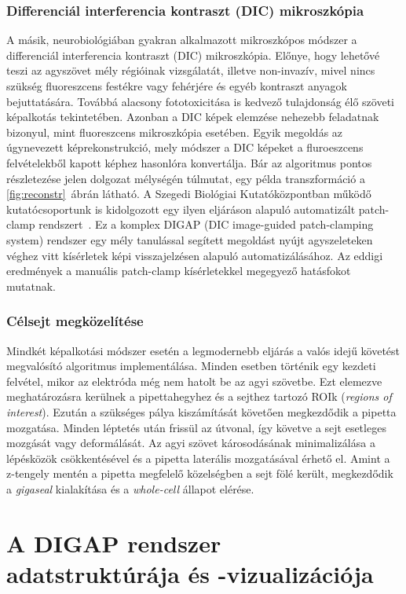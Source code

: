 \documentclass[12pt,a4paper]{report}
\begin{document}
\subsubsection*{Differenciál interferencia kontraszt (DIC) mikroszkópia}
A másik, neurobiológiában gyakran alkalmazott mikroszkópos módszer a differenciál interferencia kontraszt (DIC) mikroszkópia. Előnye, hogy lehetővé teszi az agyszövet mély régióinak vizsgálatát, illetve non-invazív, mivel nincs szükség fluoreszcens festékre vagy fehérjére és egyéb kontraszt anyagok bejuttatására. Továbbá alacsony fototoxicitása is kedvező tulajdonság élő szöveti képalkotás tekintetében. Azonban a DIC képek elemzése nehezebb feladatnak bizonyul, mint fluoreszcens mikroszkópia esetében. Egyik megoldás az úgynevezett képrekonstrukció, mely módszer a DIC képeket a fluroeszcens felvételekből kapott képhez hasonlóra konvertálja. Bár az algoritmus pontos részletezése jelen dolgozat mélységén túlmutat, egy példa transzformáció a \ref{fig:reconstr}~ábrán látható. A Szegedi Biológiai Kutatóközpontban működő kutatócsoportunk is kidolgozott egy ilyen eljáráson alapuló automatizált patch-clamp rendszert~\cite{koos2020}. Ez a komplex DIGAP (DIC image-guided patch-clamping system) rendszer egy mély tanulással segített megoldást nyújt agyszeleteken véghez vitt kísérletek képi visszajelzésen alapuló automatizálásához. Az eddigi eredmények a manuális patch-clamp kísérletekkel megegyező hatásfokot mutatnak.

\subsubsection*{Célsejt megközelítése}
Mindkét képalkotási módszer esetén a legmodernebb eljárás a valós idejű követést megvalósító algoritmus implementálása. Minden esetben történik egy kezdeti felvétel, mikor az elektróda még nem hatolt be az agyi szövetbe. Ezt elemezve meghatározásra kerülnek a pipettahegyhez és a sejthez tartozó ROIk (\textit{regions of interest}). Ezután a szükséges pálya kiszámítását követően megkezdődik a pipetta mozgatása. Minden léptetés után frissül az útvonal, így követve a sejt esetleges mozgását vagy deformálását. Az agyi szövet károsodásának minimalizálása a lépésközök csökkentésével és a pipetta laterális mozgatásával érhető el. Amint a z-tengely mentén a pipetta megfelelő közelségben a sejt fölé került, megkezdődik a \textit{gigaseal} kialakítása és a \textit{whole-cell} állapot elérése.

\section*{A DIGAP rendszer adatstruktúrája és -vizualizációja}
\end{document}
